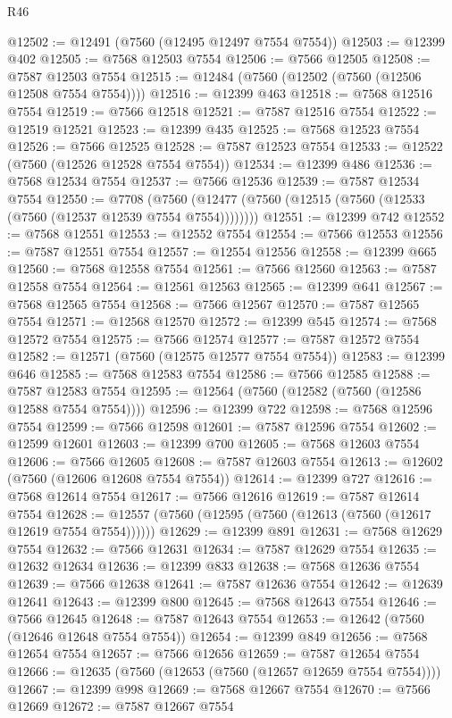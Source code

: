 \begin{lexlean}{R46}
\begin{coremodule}
@12502 := @12491 (@7560 (@12495 @12497 @7554 @7554))
@12503 := @12399 @402
@12505 := @7568 @12503 @7554
@12506 := @7566 @12505
@12508 := @7587 @12503 @7554
@12515 := @12484 (@7560 (@12502 (@7560 (@12506 @12508 @7554 @7554))))
@12516 := @12399 @463
@12518 := @7568 @12516 @7554
@12519 := @7566 @12518
@12521 := @7587 @12516 @7554
@12522 := @12519 @12521
@12523 := @12399 @435
@12525 := @7568 @12523 @7554
@12526 := @7566 @12525
@12528 := @7587 @12523 @7554
@12533 := @12522 (@7560 (@12526 @12528 @7554 @7554))
@12534 := @12399 @486
@12536 := @7568 @12534 @7554
@12537 := @7566 @12536
@12539 := @7587 @12534 @7554
@12550 := @7708
    (@7560 (@12477 (@7560 (@12515 (@7560 (@12533 (@7560 (@12537 @12539 @7554 @7554))))))))
@12551 := @12399 @742
@12552 := @7568 @12551
@12553 := @12552 @7554
@12554 := @7566 @12553
@12556 := @7587 @12551 @7554
@12557 := @12554 @12556
@12558 := @12399 @665
@12560 := @7568 @12558 @7554
@12561 := @7566 @12560
@12563 := @7587 @12558 @7554
@12564 := @12561 @12563
@12565 := @12399 @641
@12567 := @7568 @12565 @7554
@12568 := @7566 @12567
@12570 := @7587 @12565 @7554
@12571 := @12568 @12570
@12572 := @12399 @545
@12574 := @7568 @12572 @7554
@12575 := @7566 @12574
@12577 := @7587 @12572 @7554
@12582 := @12571 (@7560 (@12575 @12577 @7554 @7554))
@12583 := @12399 @646
@12585 := @7568 @12583 @7554
@12586 := @7566 @12585
@12588 := @7587 @12583 @7554
@12595 := @12564 (@7560 (@12582 (@7560 (@12586 @12588 @7554 @7554))))
@12596 := @12399 @722
@12598 := @7568 @12596 @7554
@12599 := @7566 @12598
@12601 := @7587 @12596 @7554
@12602 := @12599 @12601
@12603 := @12399 @700
@12605 := @7568 @12603 @7554
@12606 := @7566 @12605
@12608 := @7587 @12603 @7554
@12613 := @12602 (@7560 (@12606 @12608 @7554 @7554))
@12614 := @12399 @727
@12616 := @7568 @12614 @7554
@12617 := @7566 @12616
@12619 := @7587 @12614 @7554
@12628 := @12557 (@7560 (@12595 (@7560 (@12613 (@7560 (@12617 @12619 @7554 @7554))))))
@12629 := @12399 @891
@12631 := @7568 @12629 @7554
@12632 := @7566 @12631
@12634 := @7587 @12629 @7554
@12635 := @12632 @12634
@12636 := @12399 @833
@12638 := @7568 @12636 @7554
@12639 := @7566 @12638
@12641 := @7587 @12636 @7554
@12642 := @12639 @12641
@12643 := @12399 @800
@12645 := @7568 @12643 @7554
@12646 := @7566 @12645
@12648 := @7587 @12643 @7554
@12653 := @12642 (@7560 (@12646 @12648 @7554 @7554))
@12654 := @12399 @849
@12656 := @7568 @12654 @7554
@12657 := @7566 @12656
@12659 := @7587 @12654 @7554
@12666 := @12635 (@7560 (@12653 (@7560 (@12657 @12659 @7554 @7554))))
@12667 := @12399 @998
@12669 := @7568 @12667 @7554
@12670 := @7566 @12669
@12672 := @7587 @12667 @7554

\end{coremodule}
\end{lexlean}
